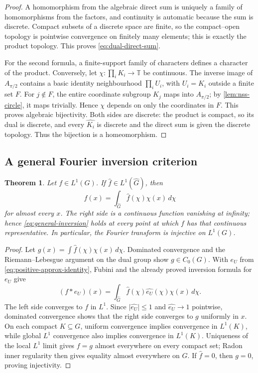 \documentclass[11pt]{article}
\newtheorem{theorem}{Theorem}[section]
\theoremstyle{definition}
\theoremstyle{remark}
\newcommand{\T}{\mathbb T}
\newcommand{\Czero}{C_0}
\newcommand{\Lp}[1]{L^{#1}}
\newcommand{\dual}[1]{\widehat{#1}}
\newcommand{\abs}[1]{\lvert #1\rvert}
\begin{document}
\begin{proof}
A homomorphism from the algebraic direct sum is uniquely a family of homomorphisms from
the factors, and continuity is automatic because the sum is discrete.  Compact subsets
of a discrete space are finite, so the compact--open topology is pointwise convergence
on finitely many elements; this is exactly the product topology.  This proves
\eqref{eq:dual-direct-sum}.

For the second formula, a finite-support family of characters defines a character of the
product.  Conversely, let $\chi:\prod_iK_i\to\T$ be continuous.  The inverse image of
$A_{\pi/2}$ contains a basic identity neighbourhood
$\prod_iU_i$, with $U_i=K_i$ outside a finite set $F$.  For $j\notin F$, the entire
coordinate subgroup $K_j$ maps into $A_{\pi/2}$; by
\cref{lem:nss-circle}, it maps trivially.  Hence $\chi$ depends on only the coordinates
in $F$.  This proves algebraic bijectivity.  Both sides are discrete: the product is
compact, so its dual is discrete, and every $\dual{K_i}$ is discrete and the direct sum
is given the discrete topology.  Thus the bijection is a homeomorphism.
\end{proof}

\subsection{A general Fourier inversion criterion}

\begin{theorem}
\label{thm:general-fourier-inversion}
Let $f\in\Lp1(G)$.  If $\widehat f\in\Lp1(\dual G)$, then
\begin{equation}
  f(x)=\int_{\dual G}\widehat f(\chi)\chi(x)\,d\chi
  \label{eq:general-inversion}
\end{equation}
for almost every $x$.  The right side is a continuous function vanishing at infinity;
hence \eqref{eq:general-inversion} holds at every point at which $f$ has that continuous
representative.  In particular, the Fourier transform is injective on $\Lp1(G)$.
\end{theorem}

\begin{proof}
Let
$g(x)=\int\widehat f(\chi)\chi(x)\,d\chi$.  Dominated convergence and the
Riemann--Lebesgue argument on the dual group show $g\in\Czero(G)$.  With $e_U$ from
\eqref{eq:positive-approx-identity}, Fubini and the already proved inversion formula for
$e_U$ give
\[
 (f*e_U)(x)
 =\int_{\dual G}\widehat f(\chi)\widehat{e_U}(\chi)\chi(x)\,d\chi.
\]
The left side converges to $f$ in $\Lp1$.  Since
$\abs{\widehat{e_U}}\leq1$ and $\widehat{e_U}\to1$ pointwise, dominated convergence
shows that the right side converges to $g$ uniformly in $x$.  On each compact
$K\subseteq G$, uniform convergence implies convergence in $\Lp1(K)$, while global
$\Lp1$ convergence also implies convergence in $\Lp1(K)$.  Uniqueness of the local
$\Lp1$ limit gives $f=g$ almost everywhere on every compact set; Radon inner regularity
then gives equality almost everywhere on $G$.  If $\widehat f=0$, then $g=0$, proving
injectivity.
\end{proof}
\end{document}
